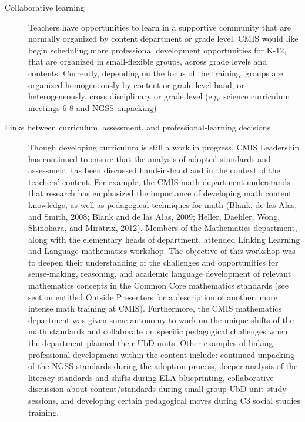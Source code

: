 \begin{findings}
\begin{description}
\item [Collaborative learning] Teachers have opportunities to learn in a supportive community that are normally organized by content department or grade level. CMIS would like begin scheduling more professional development opportunities for K-12, that are organized in small-flexible groups, across grade levels and contents. Currently, depending on the focus of the training, groups are organized homogeneously by content or grade level band, or heterogeneously, cross disciplinary or grade level (e.g. science curriculum meetings 6-8 and NGSS unpacking)
\item [Links between curriculum, assessment, and professional-learning decisions] Though developing curriculum is still a work in progress, CMIS Leadership has continued to ensure that the analysis of adopted standards and assessment has been discussed hand-in-hand and in the context of the teachers’ content. For example, the CMIS math department understands that research has emphasized the importance of developing math content knowledge, as well as pedagogical techniques for math (Blank, de las Alas, and Smith, 2008; Blank and de las Alas, 2009; Heller, Daehler, Wong, Shinohara, and Miratrix, 2012). Members of the Mathematics department, along with the elementary heads of department, attended Linking Learning and Language mathematics workshop. The objective of this workshop was to deepen their understanding of the challenges and opportunities for sense-making, reasoning, and academic language development of relevant  mathematics concepts in the Common Core mathematics standards (see section entitled Outside Presenters for a description of another, more intense math training at CMIS). Furthermore, the CMIS mathematics department was given some autonomy to work on the unique shifts of the math standards and collaborate on specific pedagogical challenges when the department planned their UbD units. Other examples of linking professional development within the content include: continued unpacking of the NGSS standards during the adoption process, deeper analysis of the literacy standards and shifts during ELA blueprinting, collaborative discussion about content/standards during small group UbD unit study sessions, and developing certain pedagogical moves during C3 social studies training. 

\end{description}
\end{findings}
